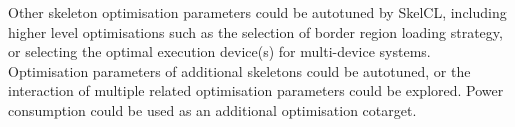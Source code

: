 Other skeleton optimisation parameters could be autotuned by SkelCL,
including higher level optimisations such as the selection of border
region loading strategy, or selecting the optimal execution device(s)
for multi-device systems. Optimisation parameters of additional
skeletons could be autotuned, or the interaction of multiple related
optimisation parameters could be explored. Power consumption could be
used as an additional optimisation cotarget.

\begin{algorithm}
  
  \caption{%
  Selecting workgroup size using a combination of classifiers and
  regressors.%
  }
  \label{alg:autotune-hybrid}
\end{algorithm}
